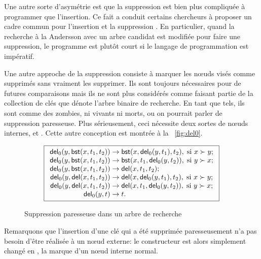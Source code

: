 Une autre sorte d'asymétrie est que la suppression est bien plus
compliquée à programmer que l'insertion. Ce fait a conduit certains
chercheurs à proposer un cadre commun pour l'insertion et la
suppression \citep{Andersson_1991,Hinze_2002}. En particulier, quand
la recherche à la Andersson avec un arbre candidat est modifiée pour
faire une suppression, le programme est plutôt court si le langage de
programmation est impératif.

Une autre approche de la suppression consiste à marquer les n{\oe}uds
visés comme supprimés sans vraiment les supprimer. Ils sont toujours
nécessaires pour de futures comparaisons mais ils ne sont plus
considérés comme faisant partie de la collection de clés que dénote
l'arbre binaire de recherche. En tant que tels, ils sont comme des
zombies, ni vivants ni morts, ou on pourrait parler de suppression
paresseuse. Plus sérieusement, ceci nécessite deux sortes de n{\oe}uds
internes,  et . Cette
autre conception est montrée à la \fig~\vref{fig:del0}.
\begin{figure}
\begin{equation*}
\boxed{
\begin{array}{r@{\;}l@{\;}l}
  \fun{del}_0(y,\fun{bst}(x,t_1,t_2)) & \rightarrow &
  \fun{bst}(x,\fun{del}_0(y,t_1),t_2),\; \text{si \(x \succ y\)};\\
\fun{del}_0(y,\fun{bst}(x,t_1,t_2)) & \rightarrow &
  \fun{bst}(x,t_1,\fun{del}_0(y,t_2)),\; \text{si \(y \succ x\)};\\
\fun{del}_0(y,\fun{bst}(x,t_1,t_2)) & \rightarrow &
  \fun{del}(x,t_1,t_2);\\
\fun{del}_0(y,\fun{del}(x,t_1,t_2)) & \rightarrow &
  \fun{del}(x,\fun{del}_0(y,t_1),t_2),\; \text{si \(x \succ y\)};\\
\fun{del}_0(y,\fun{del}(x,t_1,t_2)) & \rightarrow &
  \fun{del}(x,t_1,\fun{del}_0(y,t_2)),\; \text{si \(y \succ x\)};\\
\fun{del}_0(y,t) & \rightarrow & t.\\
\end{array}}
\end{equation*}
\caption{Suppression paresseuse dans un arbre de recherche}
\label{fig:del0}
\end{figure}
Remarquons que l'insertion d'une clé qui a été supprimée
paresseusement n'a pas besoin d'être réalisée à un n{\oe}ud externe:
le constructeur  est alors simplement changé en
, la marque d'un n{\oe}ud interne normal.

